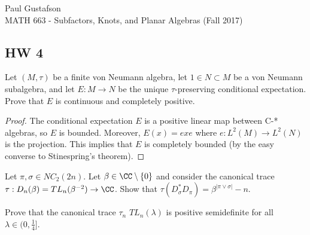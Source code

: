 \documentclass{article}
\begin{document}
\noindent Paul Gustafson\\
\noindent MATH 663 - Subfactors, Knots, and Planar Algebras (Fall 2017)

\subsection*{HW 4}
 Let $(M, \tau)$ be a finite von Neumann algebra, let $1 \in N \subset M$ be a von Neumann subalgebra, and let $E: M \to N$ be the unique $\tau$-preserving conditional expectation.  Prove that $E$ is continuous and completely positive.

\begin{proof}
  The conditional expectation $E$ is a positive linear map between C-* algebras, so $E$ is bounded. Moreover, $E(x) = exe$ where $e:L^2(M) \to L^2(N)$ is the projection.  This implies that $E$ is completely bounded (by the easy converse to Stinespring's theorem).
\end{proof}

 Let $\pi, \sigma \in NC_2(2n)$.  Let $\beta \in \CC \setminus \{0\}$ and consider the canonical trace $\tau : D_n(\beta) = TL_n(\beta^{-2}) \to \CC$.  Show that $\tau(D_\sigma^* D_\pi) = \beta^{|\pi \vee \sigma|} - n$.

 Prove that the canonical trace $\tau_n$ \on $TL_n(\lambda)$ is positive semidefinite for all $\lambda \in (0, \frac{1}{4}]$.
\end{document}
